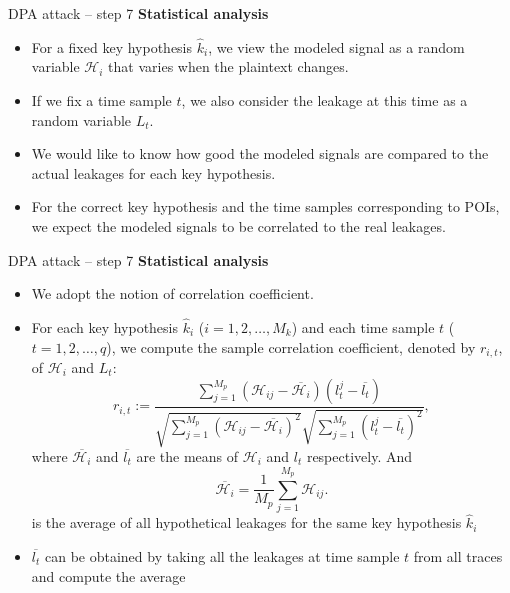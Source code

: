 \begin{frame}{DPA attack -- step 7}
\textbf{Statistical analysis}
\begin{itemize}
    \item For a fixed key hypothesis $\hat{k}_i$, we view the modeled signal as a random variable $\mathcal{H}_i$ that varies when the plaintext changes.
    \item If we fix a time sample $t$, we also consider the leakage at this time as a random variable $L_t$.
    \item We would like to know how good the modeled signals are compared to the actual leakages for each key hypothesis.
    \item For the correct key hypothesis and the time samples corresponding to POIs, we expect the modeled signals to be correlated to the real leakages.
\end{itemize}
\end{frame}

\begin{frame}{DPA attack -- step 7}
\textbf{Statistical analysis}
\begin{itemize}
    \item We adopt the notion of correlation coefficient.
    \item For each key hypothesis $\hat{k}_i$ ($i=1,2,\dots,M_k$) and each time sample $t$ ($t=1,2,\dots,q$), we compute the sample correlation coefficient, denoted by $r_{i,t}$, of $\mathcal{H}_i$ and $L_t$:
     \[
    r_{i,t}:=\frac{\sum_{j=1}^{M_p}(\mathcal{H}_{ij}-\overline{\mathcal{H}_i})(l_t^j-\overline{l_t})}{\sqrt{\sum_{j=1}^{M_p}(\mathcal{H}_{ij}-\overline{\mathcal{H}_i})^2}\sqrt{\sum_{j=1}^{M_p}(l_t^j-\overline{l_t})^2}},
    \]
    where $\overline{\mathcal{H}_i}$ and $\overline{l_t}$ are the means of $\mathcal{H}_i$ and $l_t$ respectively. And
    \[
    \overline{\mathcal{H}_i} = \frac{1}{M_p}\sum_{j=1}^{M_p}\mathcal{H}_{ij}.
    \]
    is the average of all hypothetical leakages for the same key hypothesis $\hat{k}_i$
    \item $\overline{l_t}$ can be obtained by taking all the leakages at time sample $t$ from all traces and compute the average
\end{itemize}
\end{frame}

